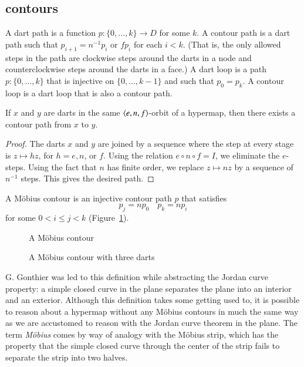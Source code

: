 \subsection{contours}

\begin{definition}  A dart path is a function $p:\{0,\ldots,k\}\to D$
for some $k$.  A contour path is a dart path such that $p_{i+1} =
n^{-1} p_i$ or $f p_i$ for each $i<k$.  (That is, the only allowed
steps in the path are clockwise steps around the darts in a node and
counterclockwise steps around the darts in a face.)  A dart loop is
a path $p:\{0,\ldots,k\}$ that is injective on $\{0,\ldots,k-1\}$
and such that $p_0 = p_k$.  A contour loop is a dart loop that is
also a contour path.
\end{definition}

\begin{lemma}\label{lemma:connect-contour}  If $x$ and $y$ are darts
in the same $\langle e,n,f\rangle$-orbit of a hypermap, then there exists
a contour path from $x$ to $y$.
\end{lemma}

\begin{proof} 
The darts
$x$ and $y$ are joined by a sequence where the step at every stage
is $z\mapsto h z$, for $h=e,n$, or $f$.  Using the relation $e\circ
n\circ f = I$, we eliminate the $e$-steps. Using the fact that $n$
has finite order, we replace $z \mapsto n z$ by a sequence
of $n^{-1}$ steps.  This gives the desired path.
\end{proof}

\begin{definition} A M\"obius contour is an
injective contour path $p$ that satisfies
    \begin{equation}
    \label{eqn:mobius}
    p_j = n p_0\quad p_k = n p_i
    \end{equation}
for some $0 < i\le j< k$ (Figure~\ref{fig:mobius}).
\end{definition}

\begin{figure}[htb]
  \centering
  \caption{A M\"obius contour}
  \label{fig:mobius}
\end{figure}

\begin{figure}[htb]
  \centering
  \caption{A M\"obius contour with three darts}
  \label{fig:3m}
\end{figure}


\begin{remark}
 G. Gonthier was led to
this definition while abstracting the Jordan curve property: a
simple closed curve in the plane separates the plane into an
interior and an exterior.  Although this definition takes some getting used to,
it is possible to reason about a hypermap without any M\"obius contours in
much the same way as we are accustomed to reason with the Jordan curve theorem
in the plane.
The term {\it M\"obius} comes by way of
analogy with the M\"obius strip, which has the property that the
simple closed curve through the center of the strip fails to
separate the strip into two halves.
\end{remark}



